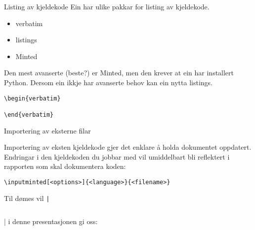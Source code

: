 \begin{frame}[containsverbatim]{Listing av kjeldekode}
	Ein har ulike pakkar for listing av kjeldekode.
	
	\begin{itemize}
		\item verbatim
		\item listings
		\item Minted
	\end{itemize}
	
	Den mest avanserte (beste?) er Minted, men den krever at ein har installert Python. Dersom ein ikkje har avanserte behov kan ein nytta listings.
	
	\begin{lstlisting}
\begin{verbatim}
	
\end{verbatim}
	\end{lstlisting}
	
\end{frame}


\begin{frame}[containsverbatim]{Importering av eksterne filar}
	
	Importering av eksten kjeldekode gjer det enklare å holda dokumentet oppdatert. Endringar i den kjeldekoden du jobbar med vil umiddelbart bli reflektert i rapporten som skal dokumentera koden:
	
	\begin{verbatim}
\inputminted[<options>]{<language>}{<filename>}
	\end{verbatim}
	
	Til dømes vil \texttt|\inputminted{csharp}{source-code/hello.cs}| i denne presentasjonen gi oss:
	
	\inputminted{csharp}{source-code/hello.cs}
	
\end{frame}